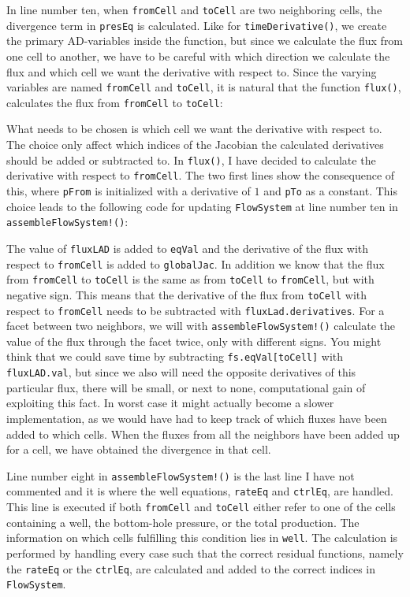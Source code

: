 In line number ten, when \texttt{fromCell} and \texttt{toCell} are two neighboring cells, the divergence term in \texttt{presEq} is calculated. Like for \texttt{timeDerivative()}, we create the primary AD-variables inside the function, but since we calculate the flux from one cell to another, we have to be careful with which direction we calculate the flux and which cell we want the derivative with respect to. Since the varying variables are named \texttt{fromCell} and \texttt{toCell}, it is natural that the function \texttt{flux()}, calculates the flux from \texttt{fromCell} to \texttt{toCell}:

What needs to be chosen is which cell we want the derivative with respect to. The choice only affect which indices of the Jacobian the calculated derivatives should be added or subtracted to. In \texttt{flux()}, I have decided to calculate the derivative with respect to \texttt{fromCell}. The two first lines show the consequence of this, where \texttt{pFrom} is initialized with a derivative of $1$ and \texttt{pTo} as a constant. This choice leads to the following code for updating \texttt{FlowSystem} at line number ten in \texttt{assembleFlowSystem!()}:

The value of \texttt{fluxLAD} is added to \texttt{eqVal} and the derivative of the flux with respect to \texttt{fromCell} is added to \texttt{globalJac}. In addition we know that the flux from \texttt{fromCell} to \texttt{toCell} is the same as from \texttt{toCell} to \texttt{fromCell}, but with negative sign. This means that the derivative of the flux from \texttt{toCell} with respect to \texttt{fromCell} needs to be subtracted with \texttt{fluxLad.derivatives}. For a facet between two neighbors, we will with \texttt{assembleFlowSystem!()} calculate the value of the flux through the facet twice, only with different signs. You might think that we could save time by subtracting \texttt{fs.eqVal[toCell]} with \texttt{fluxLAD.val}, but since we also will need the opposite derivatives of this particular flux, there will be small, or next to none, computational gain of exploiting this fact. In worst case it might actually become a slower implementation, as we would have had to keep track of which fluxes have been added to which cells. When the fluxes from all the neighbors have been added up for a cell, we have obtained the divergence in that cell. 

Line number eight in \texttt{assembleFlowSystem!()} is the last line I have not commented and it is where the well equations, \texttt{rateEq} and \texttt{ctrlEq}, are handled. This line is executed if both \texttt{fromCell} and \texttt{toCell} either refer to one of the cells containing a well, the bottom-hole pressure, or the total production. The information on which cells fulfilling this condition lies in \texttt{well}. The calculation is performed by handling every case such that the correct residual functions, namely the \texttt{rateEq} or the \texttt{ctrlEq}, are calculated and added to the correct indices in \texttt{FlowSystem}.

